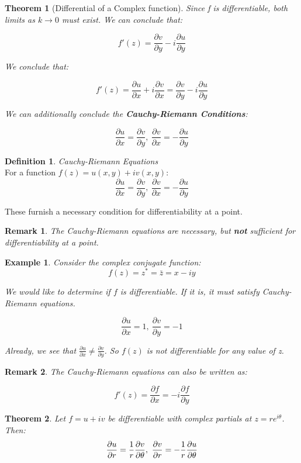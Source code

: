 \documentclass{article}
\newtheorem{theorem}{Theorem}[section]
\newtheorem{ex}{Example}
\newtheorem*{remark}{Remark}
\theoremstyle{definition}
\newtheorem{definition}{Definition}[section]
\newcommand{\Def}[2]{
\begin{shaded*}
\begin{definition}{\textit{#1}}\\#2\end{definition}
\end{shaded*}
}
\begin{document}
\begin{theorem}[Differential of a Complex function]
Since f is differentiable, both limits as $k \to 0$ must exist. We can conclude that:

$$f'(z) = \frac{\partial v}{\partial y} - i  \frac{\partial u}{\partial y}$$

We conclude that:


$$\boxed{f'(z) = \frac{\partial u}{\partial x} + i  \frac{\partial v}{\partial x} = \frac{\partial v}{\partial y} - i  \frac{\partial u}{\partial y}}$$


We can additionally conclude the \textbf{Cauchy-Riemann Conditions}:

$$\frac{\partial u}{\partial x} = \frac{\partial v}{\partial y},\ \frac{\partial v}{\partial x} = -\frac{\partial u}{\partial y}$$

\end{theorem}

\Def{Cauchy-Riemann Equations}{For a function $f(z) = u(x,y)+iv(x,y)$:
	$$\frac{\partial u}{\partial x} = \frac{\partial v}{\partial y},\ \frac{\partial v}{\partial x} = -\frac{\partial u}{\partial y}$$
	
	These furnish a necessary condition for differentiability at a point.
	
	\begin{remark}
		The Cauchy-Riemann equations are necessary, but \textbf{not} sufficient for differentiability at a point.
\end{remark}}

\begin{ex} Consider the complex conjugate function:
	$$f(z) = z^* = \bar{z} = x-iy$$
	
	We would like to determine if $f$ is differentiable. If it is, it must satisfy Cauchy-Riemann equations.
	
	$$\frac{\partial u}{\partial x} = 1,\ \frac{\partial v}{\partial y} = -1$$
	
	Already, we see that $\frac{\partial u}{\partial x} \neq \frac{\partial v}{\partial y}$. So $f(z)$ is not differentiable for any value of z.
\end{ex}

\begin{remark}
The Cauchy-Riemann equations can also be written as:

$$f'(z) = \frac{\partial f}{\partial x} = -i \frac{\partial f}{\partial y}$$

\end{remark}


\begin{theorem}
	Let $f=u+iv$ be differentiable with complex partials at $z=re^{i\theta}$. Then:
	$$\pdv{u}{r} = \frac{1}{r} \pdv{v}{\theta},\ \pdv{v}{r} = -\frac{1}{r} \pdv{u}{\theta}$$
\end{theorem}
\end{document}
